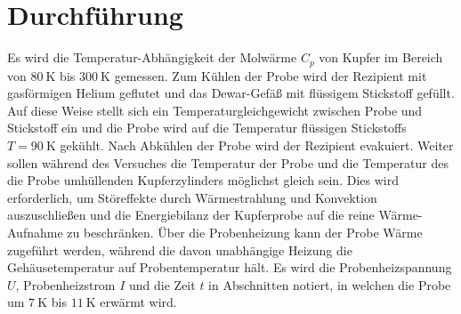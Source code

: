 \section{Durchführung}
\label{sec:durchfuehrung}
Es wird die Temperatur-Abhängigkeit der Molwärme $C_p$ von Kupfer im
Bereich von $\SI{80}{\kelvin}$ bis $\SI{300}{\kelvin}$ gemessen.
Zum Kühlen der Probe wird der Rezipient mit gasförmigen Helium geflutet
und das Dewar-Gefäß mit flüssigem Stickstoff gefüllt.
Auf diese Weise stellt sich ein Temperaturgleichgewicht zwischen Probe und Stickstoff ein und die Probe wird auf die Temperatur flüssigen Stickstoffs $T=\SI{90}{\kelvin}$ \cite{stickstoff} gekühlt.
Nach Abkühlen der Probe wird der Rezipient evakuiert.
Weiter sollen während des Versuches die Temperatur der Probe und die Temperatur des die Probe umhüllenden Kupferzylinders möglichst gleich sein.
Dies wird erforderlich, um Störeffekte durch Wärmestrahlung und Konvektion auszuschließen und die Energiebilanz der Kupferprobe auf die reine Wärme-Aufnahme zu beschränken. 
Über die Probenheizung kann der Probe Wärme zugeführt werden, 
während die davon unabhängige Heizung die Gehäusetemperatur auf Probentemperatur hält.
Es wird die Probenheizspannung $U$, Probenheizstrom $I$ und die Zeit $t$ in Abschnitten notiert, 
in welchen die Probe um $\SI{7}{\kelvin}$ bis $\SI{11}{\kelvin}$ erwärmt wird.
